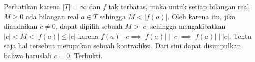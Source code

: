 
\begin{solusi}
    Perhatikan karena $|T|=\infty$ dan $f$ tak terbatas, maka untuk setiap bilangan real $M \ge 0$ ada bilangan real $a \in T$ sehingga $M < |f(a)|$. Oleh karena itu, jika diandaikan $c \neq 0$, dapat dipilih sebuah $M > |c|$ sehingga mengakibatkan $|c| < M < |f(a)| \le |c|$ karena $f(a) \mid c \implies |f(a)| \mid |c| \implies |f(a)| \mid |c|$. Tentu saja hal tersebut merupakan sebuah kontradiksi. Dari sini dapat disimpulkan bahwa haruslah $c=0$. Terbukti.
\end{solusi}